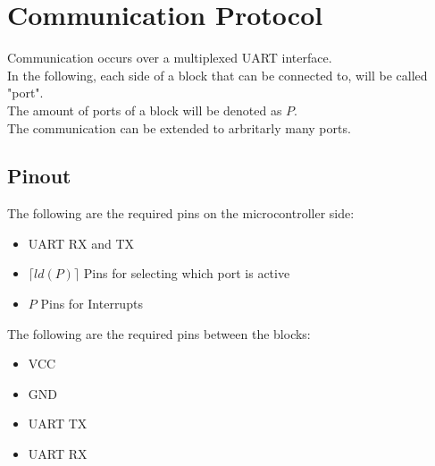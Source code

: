 
\iffalse

  \begin{titlepage}
      \begin{center}
          \vspace*{1cm}

          \textbf{BlocklyMorph}

          \vspace{0.5cm}
          \vspace{1.5cm}

          \textbf{David Rieser}
      \end{center}
  \end{titlepage}

  \pagebreak

  \tableofcontents
  \pagebreak

\fi

\section{Communication Protocol}

Communication occurs over a multiplexed UART interface.\\
In the following, each side of a block that can be connected to, will be called "port".\\
The amount of ports of a block will be denoted as $P$.\\
The communication can be extended to arbritarly many ports.

\subsection{Pinout}

The following are the required pins on the microcontroller side:
\begin{itemize}
    \item UART RX and TX
    \item $\lceil ld(P)\rceil$ Pins for selecting which port is active
    \item $P$ Pins for Interrupts
\end{itemize}

The following are the required pins between the blocks:
\begin{itemize}
    \item VCC
    \item GND
    \item UART TX
    \item UART RX
\end{itemize}


